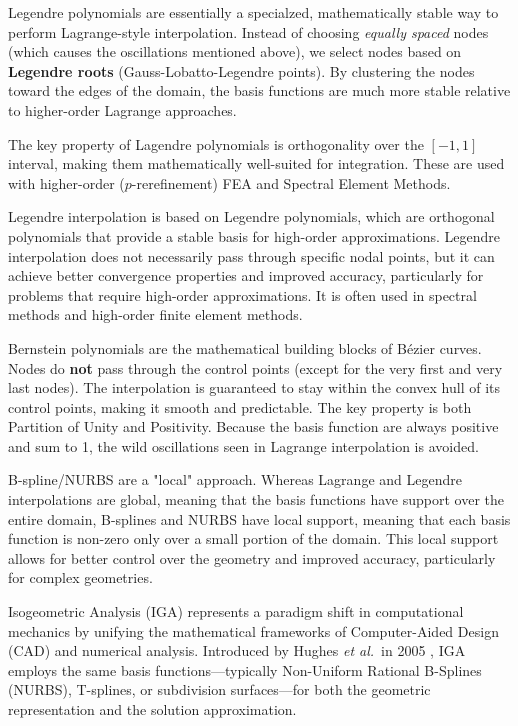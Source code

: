 \documentclass[12pt,report,justified]{SANDreport}
\begin{document}
Legendre polynomials are essentially a specialzed, mathematically stable way to perform Lagrange-style interpolation.  Instead of choosing {\em equally spaced} nodes (which causes the oscillations mentioned above), we select nodes based on {\bf Legendre roots} (Gauss-Lobatto-Legendre points).  By clustering the nodes toward the edges of the domain, the basis functions are much more stable relative to higher-order Lagrange approaches.

The key property of Lagendre polynomials is orthogonality over the $[-1, 1]$ interval, making them mathematically well-suited for integration.  These are used with higher-order ($p$-rerefinement) FEA and Spectral Element Methods.

Legendre interpolation is based on Legendre polynomials, which are orthogonal polynomials that provide a stable basis for high-order approximations.  Legendre interpolation does not necessarily pass through specific nodal points, but it can achieve better convergence properties and improved accuracy, particularly for problems that require high-order approximations.  It is often used in spectral methods and high-order finite element methods.

Bernstein polynomials are the mathematical building blocks of B{\'e}zier curves.  Nodes do {\bf not} pass through the control points (except for the very first and very last nodes).  The interpolation is guaranteed to stay within the convex hull of its control points, making it smooth and predictable.  The key property is both Partition of Unity and Positivity.  Because the basis function are always positive and sum to 1, the wild oscillations seen in Lagrange interpolation is avoided.

B-spline/NURBS are a "local" approach.  Whereas Lagrange and Legendre interpolations are global, meaning that the basis functions have support over the entire domain, B-splines and NURBS have local support, meaning that each basis function is non-zero only over a small portion of the domain.  This local support allows for better control over the geometry and improved accuracy, particularly for complex geometries.  

\label{Intro}
Isogeometric Analysis (IGA) represents a paradigm shift in computational mechanics by unifying the mathematical frameworks of Computer-Aided Design (CAD) and numerical analysis. Introduced by Hughes {\em et al.}~in 2005 \cite{Hughes2005Isogeometric}, IGA employs the same basis functions—typically Non-Uniform Rational B-Splines (NURBS), T-splines, or subdivision surfaces—for both the geometric representation and the solution approximation. 
\end{document}
